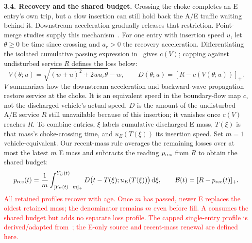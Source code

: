 \documentclass[10pt,a4paper]{article}
\newcommand{\pos}[1]{[#1]_+}
\newcommand{\bud}{\mathcal B}
\newcommand{\dd}{\,\mathrm d}
\newcommand{\rev}[1]{\textcolor{red}{#1}}
\begin{document}
\textbf{3.4. Recovery and the shared budget.}
\begingroup\color{red}
Crossing the choke completes an E entry's own trip, but a slow insertion
can still hold back the A/E traffic waiting behind it. Downstream acceleration
gradually releases that restriction. Point-merge studies supply this
mechanism~\cite{leclercq2011,leclercq}. For one entry with insertion speed
$u$, let $\theta\geq0$ be time since crossing and $a_r>0$ the recovery
acceleration. Differentiating the isolated cumulative passing expression
in~\cite{leclercq} gives $c(V)$; capping against undisturbed service $R$
defines the loss below:
\endgroup
\begin{equation}
 V(\theta;u)=\sqrt{(w+u)^2+2wa_r\theta}-w,\qquad
 D(\theta;u)=\pos{R-c(V(\theta;u))}.
 \label{eq:profile}
\end{equation}
\begingroup\color{red}
$V$ summarizes how the downstream acceleration and backward-wave propagation
restore service at the choke. It is an equivalent speed in the boundary-flow
map $c$, not the discharged vehicle's actual speed. $D$ is the amount of
the undisturbed A/E service $R$ still unavailable because of this insertion;
it vanishes once $c(V)$ reaches $R$.
To combine entries, $\xi$ labels cumulative discharged E mass,
$T(\xi)$ is that mass's choke-crossing time, and $u_E(T(\xi))$ its insertion
speed. Set $m=1$ vehicle-equivalent. Our recent-mass rule averages the
remaining losses over at most the latest $m$ E mass and subtracts the
reading $p_{\rm rec}$ from $R$ to obtain the shared budget:
\endgroup
\begin{equation}
 p_{\rm rec}(t)=\frac1m\int_{\pos{Y_E(t)-m}}^{Y_E(t)}
 D\bigl(t-T(\xi);u_E(T(\xi))\bigr)\dd\xi,\qquad
 \bud(t)=\pos{R-p_{\rm rec}(t)}.
 \label{eq:recovery}
\end{equation}
\rev{All retained profiles recover with age. Once $m$ has passed, newer
E replaces the oldest retained mass; the denominator remains $m$ even before
fill. A consumes the shared budget but adds no separate loss profile.
The capped single-entry profile is derived/adapted from~\cite{leclercq};
the E-only source and recent-mass renewal are defined here.}
\end{document}
